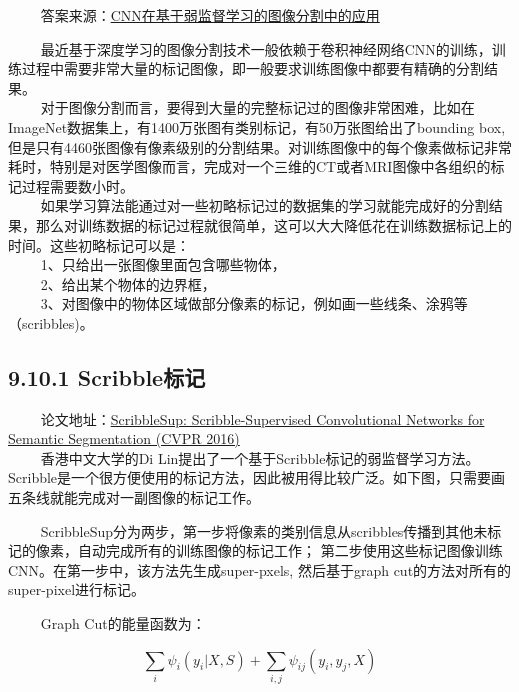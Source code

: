   
答案来源：\href{https://zhuanlan.zhihu.com/p/23811946}{CNN在基于弱监督学习的图像分割中的应用}

  
最近基于深度学习的图像分割技术一般依赖于卷积神经网络CNN的训练，训练过程中需要非常大量的标记图像，即一般要求训练图像中都要有精确的分割结果。\\
  
对于图像分割而言，要得到大量的完整标记过的图像非常困难，比如在ImageNet数据集上，有1400万张图有类别标记，有50万张图给出了bounding
box,但是只有4460张图像有像素级别的分割结果。对训练图像中的每个像素做标记非常耗时，特别是对医学图像而言，完成对一个三维的CT或者MRI图像中各组织的标记过程需要数小时。\\
  
如果学习算法能通过对一些初略标记过的数据集的学习就能完成好的分割结果，那么对训练数据的标记过程就很简单，这可以大大降低花在训练数据标记上的时间。这些初略标记可以是：\\
   1、只给出一张图像里面包含哪些物体，\\
   2、给出某个物体的边界框，\\
  
3、对图像中的物体区域做部分像素的标记，例如画一些线条、涂鸦等（scribbles)。

\subsection{9.10.1 Scribble标记}\label{scribbleux6807ux8bb0}

  
论文地址：\href{https://www.cv-foundation.org/openaccess/content_cvpr_2016/papers/Lin_ScribbleSup_Scribble-Supervised_Convolutional_CVPR_2016_paper.pdf}{ScribbleSup:
Scribble-Supervised Convolutional Networks for Semantic Segmentation
(CVPR 2016)}\\
   香港中文大学的Di
Lin提出了一个基于Scribble标记的弱监督学习方法。Scribble是一个很方便使用的标记方法，因此被用得比较广泛。如下图，只需要画五条线就能完成对一副图像的标记工作。

  
ScribbleSup分为两步，第一步将像素的类别信息从scribbles传播到其他未标记的像素，自动完成所有的训练图像的标记工作；
第二步使用这些标记图像训练CNN。在第一步中，该方法先生成super-pxels,
然后基于graph cut的方法对所有的super-pixel进行标记。

\begin{figure}
\centering
\end{figure}

   Graph Cut的能量函数为：

\[
\sum_{i}\psi _i\left(y_i|X,S\right)+\sum_{i,j}\psi_{ij}\left(y_i,y_j,X\right)
\]

